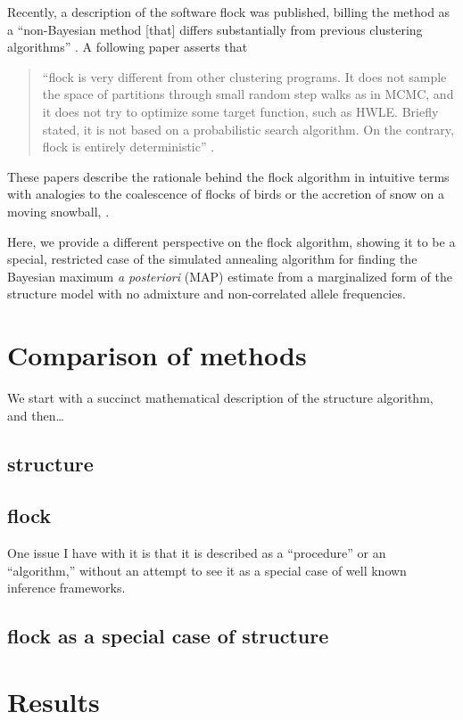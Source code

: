 Recently, a description of the software {\sc flock} was published, 
billing the method as a ``non-Bayesian method [that] 
differs substantially from previous 
clustering algorithms'' \citep[][p.~1333]{Duc&Tur2009}. A following
paper asserts that
\begin{quote}
``{\sc flock} is very different from  other clustering 
programs. It does not sample the space of partitions through small 
random step walks as in MCMC, and it does not try to optimize some 
target function, such as HWLE\@. Briefly stated, it is not based on a 
probabilistic search algorithm. On the contrary, {\sc flock} is 
entirely deterministic'' \citep[][p.~736]{Duc&Tur2012}.
\end{quote}
These papers describe the rationale behind the {\sc flock} algorithm in
intuitive terms with analogies to the coalescence of flocks of birds
or the accretion of snow on a moving snowball, \etc.  

Here, we provide a different perspective on the {\sc flock} algorithm,
showing it to be a special, restricted case of the simulated annealing
algorithm for finding the Bayesian maximum {\em a posteriori} (MAP)
estimate from a marginalized form of the {\sc structure} model with no
admixture and non-correlated allele frequencies. 

\section*{Comparison of methods}
We start with a succinct mathematical description of the {\sc structure}
algorithm, and then\ldots


\subsection*{{\sc structure}}

\subsection*{{\sc flock}}
One issue I have with it is that it is described as a ``procedure'' or 
an ``algorithm,'' without an attempt to see it as a special case of 
well known inference frameworks.


\subsection*{{\sc flock} as a special case of {\sc structure}}

\section*{Results}

